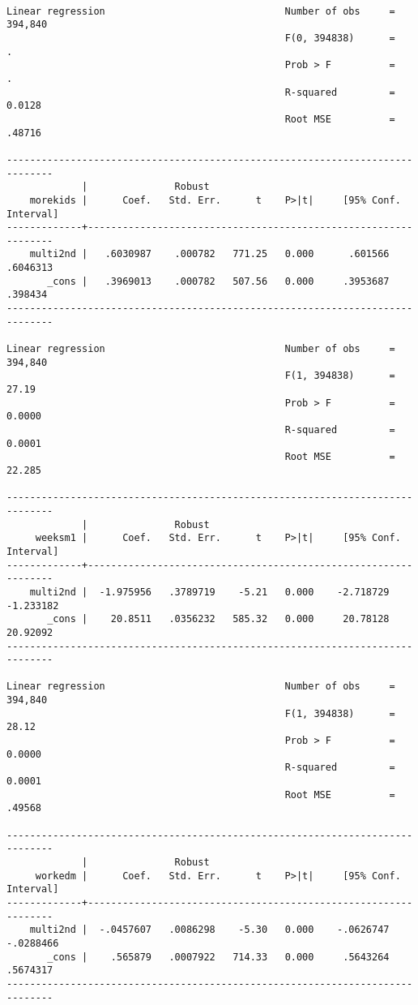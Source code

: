 \documentclass[cache=false]{article}
\begin{document}
\begin{verbatim}

Linear regression                               Number of obs     =    394,840
                                                F(0, 394838)      =          .
                                                Prob > F          =          .
                                                R-squared         =     0.0128
                                                Root MSE          =     .48716

------------------------------------------------------------------------------
             |               Robust
    morekids |      Coef.   Std. Err.      t    P>|t|     [95% Conf. Interval]
-------------+----------------------------------------------------------------
    multi2nd |   .6030987    .000782   771.25   0.000      .601566    .6046313
       _cons |   .3969013    .000782   507.56   0.000     .3953687     .398434
------------------------------------------------------------------------------

Linear regression                               Number of obs     =    394,840
                                                F(1, 394838)      =      27.19
                                                Prob > F          =     0.0000
                                                R-squared         =     0.0001
                                                Root MSE          =     22.285

------------------------------------------------------------------------------
             |               Robust
     weeksm1 |      Coef.   Std. Err.      t    P>|t|     [95% Conf. Interval]
-------------+----------------------------------------------------------------
    multi2nd |  -1.975956   .3789719    -5.21   0.000    -2.718729   -1.233182
       _cons |    20.8511   .0356232   585.32   0.000     20.78128    20.92092
------------------------------------------------------------------------------

Linear regression                               Number of obs     =    394,840
                                                F(1, 394838)      =      28.12
                                                Prob > F          =     0.0000
                                                R-squared         =     0.0001
                                                Root MSE          =     .49568

------------------------------------------------------------------------------
             |               Robust
     workedm |      Coef.   Std. Err.      t    P>|t|     [95% Conf. Interval]
-------------+----------------------------------------------------------------
    multi2nd |  -.0457607   .0086298    -5.30   0.000    -.0626747   -.0288466
       _cons |    .565879   .0007922   714.33   0.000     .5643264    .5674317
------------------------------------------------------------------------------
\end{verbatim}
\end{document}
